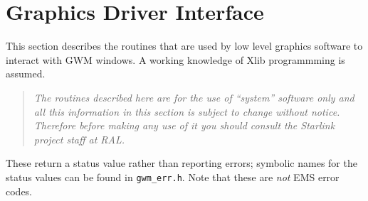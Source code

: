 \section{Graphics Driver Interface}

This section describes the routines that are used by low level graphics 
software to interact with GWM windows. A working knowledge of Xlib
programmming is assumed.
\begin{quote}\em
The routines described here are for the use of ``system'' software only
and all this information in this section is subject to change without
notice. Therefore before making any use of it you should consult the Starlink
project staff at RAL.
\end{quote}
These return a status value rather than reporting errors; symbolic names
for the status values can be found in {\tt gwm\_err.h}. Note that these are
{\em not} EMS error codes.

